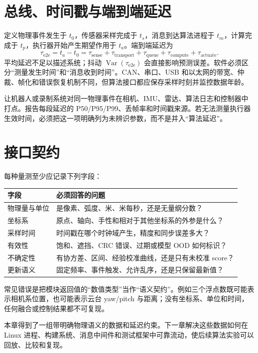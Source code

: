 \section{总线、时间戳与端到端延迟}

定义物理事件发生于 $t_0$，传感器采样完成于 $t_s$，消息到达算法进程于 $t_m$，计算完成于 $t_p$，执行器开始产生期望作用于 $t_a$。端到端延迟为
\begin{equation}
  \tau_{\mathrm{e2e}}=t_a-t_0
  =\tau_{\mathrm{sense}}+\tau_{\mathrm{transport}}+\tau_{\mathrm{queue}}+
  \tau_{\mathrm{compute}}+\tau_{\mathrm{actuate}}.
\end{equation}
平均延迟不足以描述系统；抖动 $\operatorname{Var}(\tau_{\mathrm{e2e}})$ 会直接影响预测误差。软件必须区分“测量发生时间”和“消息收到时间”。CAN、串口、USB 和以太网的带宽、仲裁、帧化和错误恢复机制不同，但算法接口都应保存采样时刻并监控数据年龄。

\begin{engineeringcheck}
让机器人或录制系统对同一物理事件在相机、IMU、雷达、算法日志和控制器中打点。报告每段延迟的 P50/P95/P99、丢帧率和时间戳来源。若无法测量执行器生效时间，必须把这一项明确列为未辨识参数，而不是并入“算法延迟”。
\end{engineeringcheck}

\section{接口契约}

每种量测至少应记录下列字段：

\begin{longtable}{p{}p{}}
\toprule
字段 & 必须回答的问题 \\
\midrule
物理量与单位 & 是像素、弧度、米、米每秒，还是无量纲分数？ \\
坐标系 & 原点、轴向、手性和相对于其他坐标系的外参是什么？ \\
采样时间 & 时间戳在哪个时钟域产生，精度和同步误差多大？ \\
有效性 & 饱和、遮挡、CRC 错误、过期或模型 OOD 如何标识？ \\
不确定性 & 有协方差、区间、经验校准曲线，还是只有未校准 score？ \\
更新语义 & 固定频率、事件触发、允许乱序，还是只保留最新值？ \\
\bottomrule
\end{longtable}

\begin{failuremode}
常见错误是把模块返回值的“数值类型”当作“语义契约”。例如三个浮点数既可能表示相机系位置，也可能表示云台 yaw/pitch 与距离；没有坐标系、单位和时间，任何融合或控制结果都不可复现。
\end{failuremode}

\begin{chaptertransition}
本章得到了一组带明确物理语义的数据和延迟约束。下一章解决这些数据如何在 Linux 进程、构建系统、消息中间件和测试框架中可靠流动，使后续算法实验可以回放、比较和复现。
\end{chaptertransition}

